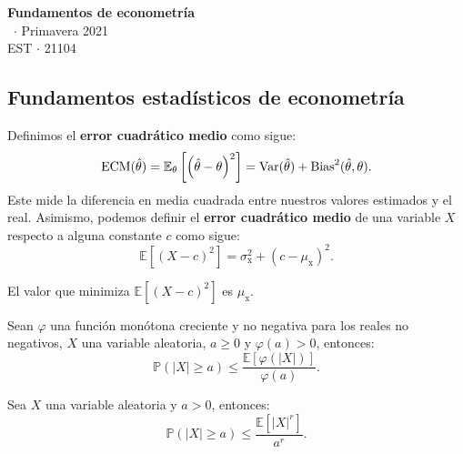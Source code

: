 \documentclass[8pt,a4paper]{extarticle}
\renewcommand{\csClass}{Fundamentos de econometría}
\renewcommand{\csClassCode}{EST $\cdot$ 21104}
\renewcommand{\csTerm}{Primavera 2021}
\begin{document}
\begin{titlepage}
	\begin{center}
		\vspace*{1cm}
		\Huge
		\textbf{\csClass}
		\vspace{0.5cm} \\
		\Large
		\cs\ $\cdot$ \csTerm
		\vfill
		\csAuthorName\\
		\vspace{0.8cm}
		\csClassCode\\
		\csSchool
	\end{center}
\end{titlepage}

\begin{multicols}{3}
	\setcounter{page}{1}

	\section{Fundamentos estadísticos de econometría}

	\begin{boxdef}
		Definimos el \textbf{error cuadrático medio} como sigue:
		\[
			\text{\normalfont ECM} (\hat{\theta}) = \mathbb{E}_{\theta} \left[ \left( \hat{\theta} - \theta \right)^2  \right]  = \text{\normalfont Var} (\hat{\theta}) + \text{\normalfont Bias}^{2} (\hat{\theta}, \theta)
			.\]
		Este mide la diferencia en media cuadrada entre nuestros valores estimados y el real. Asimismo, podemos definir el \textbf{error cuadrático medio} de una variable $X$ respecto a alguna constante $c$ como sigue:
		\[
			\mathbb{E} \left[ (X - c)^2 \right] = \sigma^2_{\mathrm{x}} + (c - \mu_\mathrm{x})^2
			.\]
	\end{boxdef}

	\begin{boxtheo}
		El valor que minimiza $\mathbb{E}\left[(X-c)^2\right]$ es $\mu_{\mathrm{x}}$.
	\end{boxtheo}

	\begin{boxcor}
		Sean $\varphi$ una función monótona creciente y no negativa para los reales no negativos, $X$ una variable aleatoria, $a \ge 0$ y $\varphi(a) > 0$, entonces:
		\[
			\mathbb{P}\left( \left| X \right| \ge a \right) \le \frac{\mathbb{E}\left[ \varphi \left( \left| X \right|  \right)  \right] }{\varphi(a)}
			.\]
	\end{boxcor}

	\begin{boxcor}
		Sea $X$ una variable aleatoria y $a > 0$, entonces:
		\[
			\mathbb{P}\left( \left| X \right| \ge a  \right) \le \frac{\mathbb{E}\left[ \left| X \right|^r  \right] }{a^r}
			.\]
	\end{boxcor}


\end{multicols}
\end{document}
